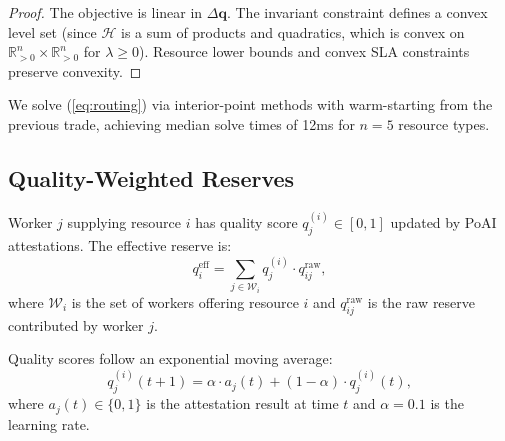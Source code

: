 \begin{proof}
The objective is linear in $\Delta\bm{q}$. The invariant constraint defines a convex level set (since $\mathcal{H}$ is a sum of products and quadratics, which is convex on $\mathbb{R}^n_{>0} \times \mathbb{R}^n_{>0}$ for $\lambda \ge 0$). Resource lower bounds and convex SLA constraints preserve convexity.
\end{proof}

We solve (\ref{eq:routing}) via interior-point methods with warm-starting from the previous trade, achieving median solve times of 12ms for $n = 5$ resource types.

\subsection{Quality-Weighted Reserves}

Worker $j$ supplying resource $i$ has quality score $q_j^{(i)} \in [0, 1]$ updated by PoAI attestations. The effective reserve is:
\begin{equation}
q_i^{\text{eff}} = \sum_{j \in \mathcal{W}_i} q_j^{(i)} \cdot q_{ij}^{\text{raw}},
\end{equation}
where $\mathcal{W}_i$ is the set of workers offering resource $i$ and $q_{ij}^{\text{raw}}$ is the raw reserve contributed by worker $j$.

Quality scores follow an exponential moving average:
\begin{equation}
q_j^{(i)}(t+1) = \alpha \cdot a_j(t) + (1 - \alpha) \cdot q_j^{(i)}(t),
\end{equation}
where $a_j(t) \in \{0, 1\}$ is the attestation result at time $t$ and $\alpha = 0.1$ is the learning rate.

